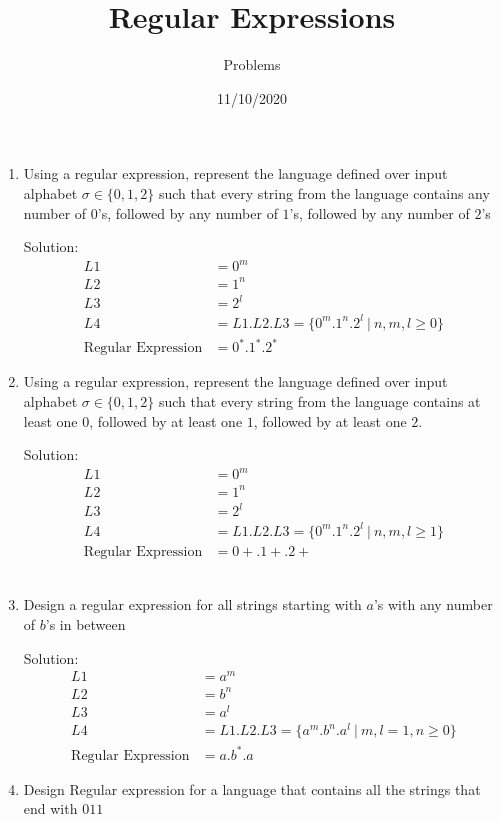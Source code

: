 \documentclass[12pt]{article}
\title{Regular Expressions}
\author{Problems}
\date{11/10/2020}
\begin{document}
\maketitle


\begin{enumerate}
  \item Using a regular expression, represent the language defined over input alphabet $\sigma \in \{0,1,2\}$ such that every string from the language contains any number of $0$'s, followed by any number of $1$'s, followed by any number of $2$'s 
  
  {Solution}:
  \begin{align*}
  L1 &= 0^m \\
  L2 &= 1^n \\
  L3 &= 2^l \\
  L4 &= L1 . L2 . L3 = \{ 0^m . 1^n . 2^l ~| ~n,m,l \geq 0 \} \\
  \text{Regular Expression} &= 0^*.1^*.2^*
  \end{align*}
  
  
  \item Using a regular expression, represent the language defined over input alphabet $\sigma \in \{0,1,2\}$ such that every string from the language contains at least one $0$, followed by at least one $1$, followed by at least one $2$.
  
  Solution:
  \begin{align*}
  L1 &= 0^m \\
  L2 &= 1^n \\ 
  L3 &= 2^l \\
  L4 &= L1 . L2 . L3= \{0^m . 1^n . 2^l ~|~ n,m,l \geq 1 \} \\
  \text{Regular Expression} &= 0+.1+.2+
  \end{align*} \\
  
  \item Design a regular expression for all strings starting with $a$'s with any number of $b$'s in between 
  
  Solution:
  \begin{align*}
  L1 &= a^m\\
  L2 &= b^n\\
  L3 &= a^l\\
  L4 &= L1 . L2 . L3= \{a^m . b^n . a^l ~|~ m,l =1 , n \geq 0\}\\
  \text{Regular Expression} &= a.b^*.a
  \end{align*}

  \item Design Regular expression for a language that contains all the strings that end with $011$
  

\end{enumerate}
\end{document}
